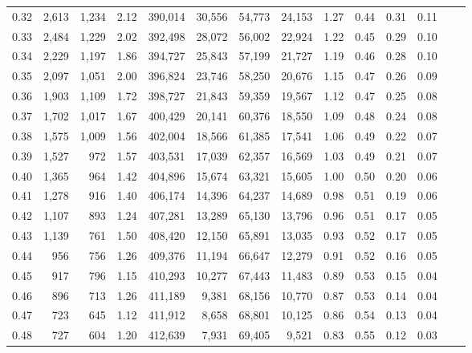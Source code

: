 \begin{tabular}{rrrrrrrrrrrrrr}
0.32 &   2,613 &  1,234 &    2.12 &  390,014 &   30,556 &  54,773 &  24,153 &  1.27 &  0.44 &  0.31 &      0.11 \\
0.33 &   2,484 &  1,229 &    2.02 &  392,498 &   28,072 &  56,002 &  22,924 &  1.22 &  0.45 &  0.29 &      0.10 \\
0.34 &   2,229 &  1,197 &    1.86 &  394,727 &   25,843 &  57,199 &  21,727 &  1.19 &  0.46 &  0.28 &      0.10 \\
0.35 &   2,097 &  1,051 &    2.00 &  396,824 &   23,746 &  58,250 &  20,676 &  1.15 &  0.47 &  0.26 &      0.09 \\
0.36 &   1,903 &  1,109 &    1.72 &  398,727 &   21,843 &  59,359 &  19,567 &  1.12 &  0.47 &  0.25 &      0.08 \\
0.37 &   1,702 &  1,017 &    1.67 &  400,429 &   20,141 &  60,376 &  18,550 &  1.09 &  0.48 &  0.24 &      0.08 \\
0.38 &   1,575 &  1,009 &    1.56 &  402,004 &   18,566 &  61,385 &  17,541 &  1.06 &  0.49 &  0.22 &      0.07 \\
0.39 &   1,527 &    972 &    1.57 &  403,531 &   17,039 &  62,357 &  16,569 &  1.03 &  0.49 &  0.21 &      0.07 \\
0.40 &   1,365 &    964 &    1.42 &  404,896 &   15,674 &  63,321 &  15,605 &  1.00 &  0.50 &  0.20 &      0.06 \\
0.41 &   1,278 &    916 &    1.40 &  406,174 &   14,396 &  64,237 &  14,689 &  0.98 &  0.51 &  0.19 &      0.06 \\
0.42 &   1,107 &    893 &    1.24 &  407,281 &   13,289 &  65,130 &  13,796 &  0.96 &  0.51 &  0.17 &      0.05 \\
0.43 &   1,139 &    761 &    1.50 &  408,420 &   12,150 &  65,891 &  13,035 &  0.93 &  0.52 &  0.17 &      0.05 \\
0.44 &     956 &    756 &    1.26 &  409,376 &   11,194 &  66,647 &  12,279 &  0.91 &  0.52 &  0.16 &      0.05 \\
0.45 &     917 &    796 &    1.15 &  410,293 &   10,277 &  67,443 &  11,483 &  0.89 &  0.53 &  0.15 &      0.04 \\
0.46 &     896 &    713 &    1.26 &  411,189 &    9,381 &  68,156 &  10,770 &  0.87 &  0.53 &  0.14 &      0.04 \\
0.47 &     723 &    645 &    1.12 &  411,912 &    8,658 &  68,801 &  10,125 &  0.86 &  0.54 &  0.13 &      0.04 \\
0.48 &     727 &    604 &    1.20 &  412,639 &    7,931 &  69,405 &   9,521 &  0.83 &  0.55 &  0.12 &      0.03 \\

\end{tabular}

